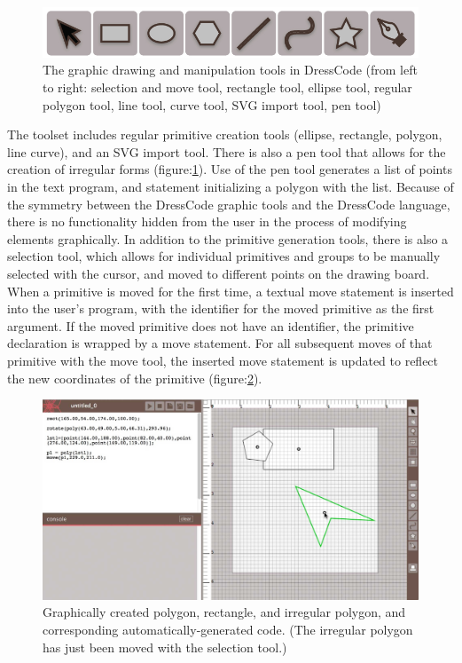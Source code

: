 \documentclass{sigchi}
\begin{document}
\begin{center}
\begin{figure}[h!]
\includegraphics[width=\columnwidth]{images/graphic_tools.jpg}
\caption{The graphic drawing and manipulation tools in DressCode (from left to right: selection and move tool, rectangle tool, ellipse tool, regular polygon tool, line tool, curve tool, SVG import tool, pen tool)}
\label{fig:graphic_tools}
\end{figure}
\end{center}

The toolset includes regular primitive creation tools (ellipse, rectangle, polygon, line curve), and an SVG import tool. There is also a pen tool that allows for the creation of irregular forms (figure:\ref{fig:graphic_tools}). Use of the pen tool generates a list of points in the text program, and statement initializing a polygon with the list. Because of the symmetry between the DressCode graphic tools and the DressCode language, there is no functionality hidden from the user in the process of modifying elements graphically. In addition to the primitive generation tools, there is also a selection tool, which allows for individual primitives and groups to be manually selected with the cursor, and moved to different points on the drawing board. When a primitive is moved for the first time, a textual move statement is inserted into the user's program, with the identifier for the moved primitive as the first argument. If the moved primitive does not have an identifier, the primitive declaration is wrapped by a move statement. For all subsequent moves of that primitive with the move tool, the inserted move statement is updated to reflect the new coordinates of the primitive (figure:\ref{fig:auto_generated_code}).

\begin{center}
\begin{figure}[h!]
\includegraphics[width=\columnwidth]{images/auto_generated_code.jpg}
\caption{Graphically created polygon, rectangle, and irregular polygon, and corresponding automatically-generated code. (The irregular polygon has just been moved with the selection tool.)}
\label{fig:auto_generated_code}
\end{figure}
\end{center}
\end{document}

